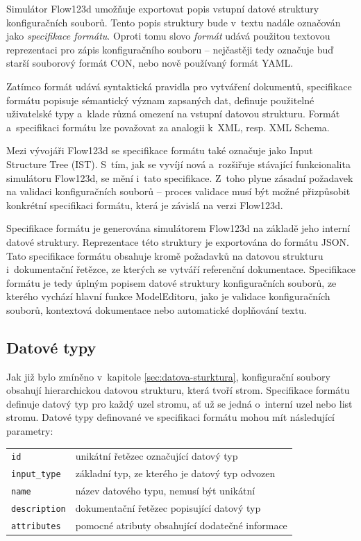 \documentclass[FM,bw,DP]{tulthesis}
\begin{document}
Simulátor Flow123d umožňuje exportovat popis vstupní datové struktury konfiguračních souborů. Tento popis struktury bude v~textu nadále označován jako \textit{specifikace formátu}. Oproti tomu slovo \textit{formát} udává použitou textovou reprezentaci pro zápis konfiguračního souboru -- nejčastěji tedy označuje buď starší souborový formát CON, nebo nově používaný formát YAML.

Zatímco formát udává syntaktická pravidla pro vytváření dokumentů, specifikace formátu popisuje sémantický význam zapsaných dat, definuje použitelné uživatelské typy a~klade různá omezení na vstupní datovou strukturu. Formát a~specifikaci formátu lze považovat za analogii k~XML, resp. XML Schema.

Mezi vývojáři Flow123d se specifikace formátu také označuje jako Input Structure Tree (IST). S~tím, jak se vyvíjí nová a~rozšiřuje stávající funkcionalita simulátoru Flow123d, se mění i~tato specifikace. Z~toho plyne zásadní požadavek na validaci konfiguračních souborů -- proces validace musí být možné přizpůsobit konkrétní specifikaci formátu, která je závislá na verzi Flow123d.

Specifikace formátu je generována simulátorem Flow123d na základě jeho interní datové struktury. Reprezentace této struktury je exportována do formátu JSON. Tato specifikace formátu obsahuje kromě požadavků na datovou strukturu i~dokumentační řetězce, ze kterých se vytváří referenční dokumentace. Specifikace formátu je tedy úplným popisem datové struktury konfiguračních souborů, ze kterého vychází hlavní funkce ModelEditoru, jako je validace konfiguračních souborů, kontextová dokumentace nebo automatické doplňování textu.

\subsection{Datové typy}
\label{sec:analyza-specifikace-formatu-datove-typy}
Jak již bylo zmíněno v~kapitole \ref{sec:datova-sturktura}, konfigurační soubory obsahují hierarchickou datovou strukturu, která tvoří strom. Specifikace formátu definuje datový typ pro každý uzel stromu, ať už se jedná o~interní uzel nebo list stromu. Datové typy definované ve specifikaci formátu mohou mít následující parametry:

\vspace{0.5cm}
\begin{tabular}{m{3cm}@{}l}
\texttt{id}\dotfill & unikátní řetězec označující datový typ \\
\texttt{input\_type}\dotfill & základní typ, ze kterého je datový typ odvozen  \\
\texttt{name}\dotfill & název datového typu, nemusí být unikátní \\
\texttt{description}\dotfill & dokumentační řetězec popisující datový typ \\
\texttt{attributes}\dotfill & pomocné atributy obsahující dodatečné informace \\
\end{tabular}
\vspace{0.5cm}
\end{document}
